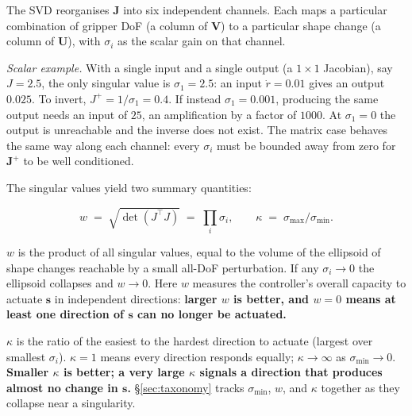 \documentclass[11pt,a4paper]{article}
\begin{document}
\begin{intuition}
The SVD reorganises $\mathbf{J}$ into six independent channels. Each maps a particular combination
of gripper DoF (a column of $\mathbf{V}$) to a particular shape change (a column of $\mathbf{U}$), with
$\sigma_i$ as the scalar gain on that channel.

\smallskip
\noindent\textit{Scalar example.} With a single input and a single output (a $1\times 1$
Jacobian), say $J=2.5$, the only singular value is $\sigma_1=2.5$: an input $\dot r=0.01$
gives an output $0.025$. To invert, $J^{+}=1/\sigma_1=0.4$. If instead $\sigma_1=0.001$,
producing the same output needs an input of $25$, an amplification by a factor of $1000$.
At $\sigma_1=0$ the output is unreachable and the inverse does not exist. The matrix case
behaves the same
way along each channel: every $\sigma_i$ must be bounded away from zero for $\mathbf{J}^{+}$ to be
well conditioned.
\end{intuition}

The singular values yield two summary quantities:
\begin{tcolorbox}[mathbox]
\begin{equation}
    w \;=\; \sqrt{\det(J^{\top}J)} \;=\; \prod_i \sigma_i,
    \qquad
    \kappa \;=\; \sigma_{\max}/\sigma_{\min}.
\end{equation}
\end{tcolorbox}

\begin{intuition}
$w$ is the product of all singular values, equal to the volume of the ellipsoid of shape
changes reachable by a small all-DoF perturbation. If any $\sigma_i\to 0$ the ellipsoid
collapses and $w\to 0$. Here $w$ measures the controller's overall capacity to actuate $\mathbf{s}$
in independent directions: \textbf{larger $w$ is better, and $w=0$ means at least one
direction of $\mathbf{s}$ can no longer be actuated.}

\smallskip
\noindent $\kappa$ is the ratio of the easiest to the hardest direction to actuate
(largest over smallest $\sigma_i$). $\kappa=1$ means every direction responds equally;
$\kappa\to\infty$ as $\sigma_{\min}\to 0$. \textbf{Smaller $\kappa$ is better; a very
large $\kappa$ signals a direction that produces almost no change in $\mathbf{s}$.}
\S\ref{sec:taxonomy} tracks $\sigma_{\min}$, $w$, and $\kappa$ together as they collapse
near a singularity.
\end{intuition}
\end{document}
